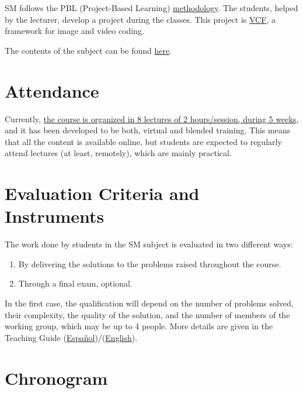 SM follows the PBL (Project-Based Learning)
\href{http://portafirma.ual.es/pfirma/downloadReport/file?idDocument=4u61Ie5es2&idRequest=ZeBY35LlFa}{methodology}. The
students, helped by the lecturer, develop a project during the
classes. This project is
\href{https://github.com/Sistemas-Multimedia/VCF}{VCF}, a framework
for image and video coding.

The contents of the subject can be found \href{https://sistemas-multimedia.github.io/contents/}{here}.

\section{Attendance}

Currently,
\href{https://www.ual.es/estudios/masteres/presentacion/plandeestudios/asignatura/7114/71142105}{the
  course is organized in 8 lectures of 2 hours/session, during 5
  weeks}, and it has been developed to be both, virtual and
blended training. This means that all the content is available
online, but students are expected to regularly attend lectures (at
least, remotely), which are mainly practical.

\section{Evaluation Criteria and Instruments}

The work done by students in the SM subject is evaluated in two
different ways:

\begin{enumerate}
\item By delivering the solutions to the problems raised throughout
  the course.

\item Through a final exam, optional.
\end{enumerate}

In the first case, the qualification will depend on the number of
problems solved, their complexity, the quality of the solution, and
the number of members of the working group, which may be up to 4
people. More details are given in the Teaching Guide
(\href{https://portafirma.ual.es/pfirma/downloadReport/file?idDocument=BfF99nW06C&idRequest=miB6Ni0U5S}{Español})/(\href{https://portafirma.ual.es/pfirma/downloadReport/file?idDocument=4u61Ie5es2&idRequest=ZeBY35LlFa}{English}).

\section{Chronogram}

